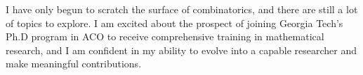 \documentclass[12pt]{article}
\begin{document}
I have only begun to scratch the surface of combinatorics, and there are still a lot of topics to
explore. I am excited about the prospect of joining Georgia Tech's Ph.D program in ACO to receive
comprehensive training in mathematical research, and I am confident in my ability to evolve into a
capable researcher and make meaningful contributions.  

\newpage



\end{document}
